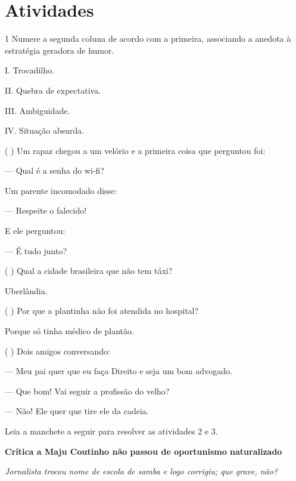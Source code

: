 \section*{Atividades}

\num{1} Numere a segunda coluna de acordo com a primeira, associando a
anedota à estratégia geradora de humor.

\begin{multicols}{2}

I. Trocadilho.

II. Quebra de expectativa.

III. Ambiguidade.

IV. Situação absurda.

\columnbreak

(  ) Um rapaz chegou a um velório e a primeira coisa que perguntou foi:

--- Qual é a senha do wi-fi?

Um parente incomodado disse:

--- Respeite o falecido!

E ele perguntou:

--- É tudo junto?


(  ) Qual a cidade brasileira que não tem táxi?

Uberlândia.


(  ) Por que a plantinha não foi atendida no hospital?

Porque só tinha médico de plantão.


(  ) Dois amigos conversando:

--- Meu pai quer que eu faça Direito e seja um bom advogado.

--- Que bom! Vai seguir a profissão do velho?

--- Não! Ele quer que tire ele da cadeia.
\end{multicols}


Leia a manchete a seguir para resolver as atividades 2 e 3.

\begin{myquote}
\textbf{Crítica a Maju Coutinho não passou de oportunismo naturalizado}

\emph{Jornalista trocou nome de escola de samba e logo corrigiu; que
grave, não?}

\end{myquote}

